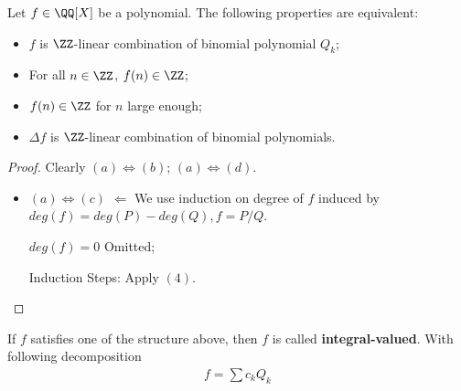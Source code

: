 \documentclass[Total.tex]{subfiles}
\begin{document}
				\begin{proposition}
					Let $f\in \QQ[X]$ be a polynomial. The following properties are equivalent:
					\begin{itemize}
						\item $f$ is $\ZZ$-linear combination of binomial polynomial $Q_k$;
						\item For all $n\in \ZZ$, $f(n)\in \ZZ$;
						\item $f(n)\in \ZZ$ for $n$ large enough;
						\item $\Delta f$ is $\ZZ$-linear combination of binomial polynomials.
					\end{itemize}
				\end{proposition}
				\begin{proof}
					Clearly $(a)\Leftrightarrow (b)$; $(a)\Leftrightarrow (d)$.
					
					\begin{itemize}
						\item $(a)\Leftrightarrow (c)$ $\Leftarrow$ We use induction on degree of $f$ induced by $deg(f)=deg(P)-deg(Q),f=P/Q$. 
						
						$deg(f)=0$ Omitted;
						
						Induction Steps: Apply $(4)$.
					\end{itemize}
				\end{proof}
				\begin{Def}
					If $f$ satisfies one of the structure above, then $f$ is called \textbf{integral-valued}. With following decomposition
					\begin{gather*}
						f=\sum c_k Q_k
					\end{gather*}
				\end{Def}
\end{document}
